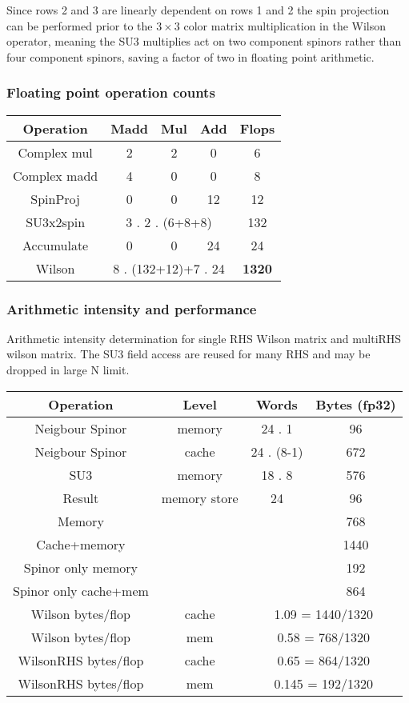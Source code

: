 \documentclass[letter,10pt]{report}
\begin{document}
Since rows 2 and 3 are linearly dependent on rows 1 and 2 the spin projection can be performed prior to the
$3\times 3$ color matrix multiplication in the Wilson operator, meaning the SU3 multiplies act on two component
spinors rather than four component spinors, saving a factor of two in floating point arithmetic.

\subsubsection{Floating point operation counts}

\begin{tabular}{ccccc}
  Operation    & Madd & Mul & Add & Flops \\
  \hline
  Complex mul  & 2 & 2  & 0 & 6 \\
  Complex madd & 4 & 0  & 0 & 8 \\
  SpinProj     & 0 & 0  & 12 & 12 \\
  SU3x2spin   & \multicolumn{3}{c}{ 3 . 2 . (6+8+8) }& 132 \\
  Accumulate  & 0 & 0 & 24 & 24\\
  \hline
  Wilson      & \multicolumn{3}{c}{8 . (132+12)+7 .  24} & {\bf 1320}
\end{tabular}

\subsubsection{Arithmetic intensity and performance}
Arithmetic intensity determination for single RHS Wilson matrix and multiRHS wilson matrix.
The SU3 field access are reused for many RHS and may be dropped in large N limit.

\begin{tabular}{cccc}
  Operation    & Level & Words & Bytes (fp32) \\
  \hline
  Neigbour Spinor       & memory&  24 .  1   & 96   \\
  Neigbour Spinor       & cache &  24 .  (8-1)    & 672  \\
  SU3                   & memory&  18 .  8  & 576 \\
  Result                & memory store & 24 & 96 \\
  \hline
  Memory              & & &  768 \\
  Cache+memory        & & & 1440 \\
  Spinor only memory     & & & 192 \\
  Spinor only cache+mem  & & & 864 \\
  \hline
  Wilson bytes/flop &cache    & \multicolumn{2}{c}{ 1.09 = 1440/1320}\\
  Wilson bytes/flop &mem      &  \multicolumn{2}{c}{ 0.58 = 768/1320}\\
  WilsonRHS bytes/flop& cache    & \multicolumn{2}{c}{ 0.65 = 864/1320}\\
  WilsonRHS bytes/flop& mem      &  \multicolumn{2}{c}{ 0.145 = 192/1320}\\
  \hline
\end{tabular}
\end{document}
